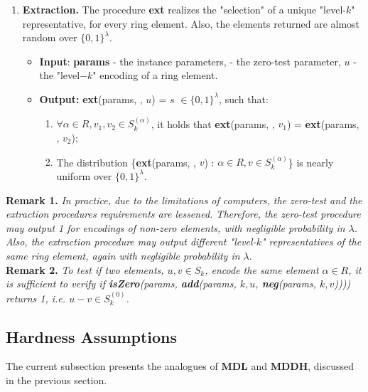 \begin{enumerate}[label=(\alph*)]
	\item \textbf{Extraction.} The procedure \textbf{ext} realizes the "selection" of a unique "level-$k$" representative, for every ring element. Also, the elements returned are almost random over $\{0, 1\}^\lambda$.
	\begin{itemize}
		\item \textbf{Input}: \textbf{params} - the instance parameters, {\pzt} - the zero-test parameter, {\boldmath$u$} - the "level$-k$" encoding of a ring element.
		\item \textbf{Output:} \textbf{ext}(params, {\pzt}, $u$) = {\boldmath$s$} $\in \{0,1\}^\lambda$, such that:
		\begin{enumerate}[label=(\roman*)]
			\item $\forall \alpha \in R, v_1,v_2\in S_k^{(\alpha)}$, it holds that \textbf{ext}(params, {\pzt}, $v_1$) = \textbf{ext}(params, {\pzt}, $v_2$);
			\item The distribution \{\textbf{ext}(params, {\pzt}, $v$) : $\alpha \in R, v \in S_k^{(\alpha)}$\} is nearly uniform over $\{0,1\}^\lambda$.
		\end{enumerate}
	\end{itemize}
	
	
\end{enumerate}

\textbf{Remark 1.} \textit{In practice, due to the limitations of computers, the zero-test and the extraction procedures requirements are lessened. Therefore, the zero-test procedure may output 1 for encodings of non-zero elements, with negligible probability in $\lambda$. Also, the extraction procedure may output different "level-$k$" representatives of the same ring element, again with negligible probability in $\lambda$}.\\

\textbf{Remark 2.} \textit{To test if two elements, $u, v\in S_k$, encode the same element $\alpha \in R$, it is sufficient to verify if \textbf{isZero}(params, \textbf{add}(params, $k, u$, \textbf{neg}(params, $k, v$)))) returns 1, i.e. $u - v \in S_k^{(0)}$.}

\subsection{Hardness Assumptions}

The current subsection presents the analogues of \textbf{MDL} and \textbf{MDDH}, discussed in the previous section. 

